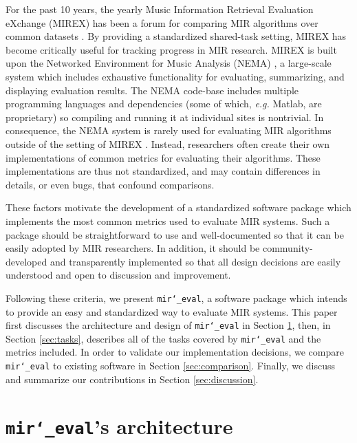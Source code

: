 \documentclass{article}
\def\eg{\emph{e.g.}}
\def\mireval{\texttt{mir\char`_eval}}
\begin{document}
For the past 10 years, the yearly Music Information Retrieval Evaluation eXchange (MIREX) has been a forum for comparing MIR algorithms over common datasets \cite{downie2008music}.
By providing a standardized shared-task setting, MIREX has become critically useful for tracking progress in MIR research.
MIREX is built upon the Networked Environment for Music Analysis (NEMA) \cite{west2010networked}, a large-scale system which includes exhaustive functionality for evaluating, summarizing, and displaying evaluation results.
The NEMA code-base includes multiple programming languages and dependencies (some of which, \eg{} Matlab, are proprietary) so compiling and running it at individual sites is nontrivial. 
%
In consequence, the NEMA system is rarely used for evaluating MIR algorithms outside of the setting of MIREX \cite{downie2008music}.
Instead, researchers often create their own implementations of common metrics for evaluating their algorithms.
These implementations are thus not standardized, and may contain differences in details, or even bugs, that confound comparisons.

These factors motivate the development of a standardized software package which implements the most common metrics used to evaluate MIR systems.
Such a package should be straightforward to use and well-documented so that it can be easily adopted by MIR researchers.
In addition, it should be community-developed and transparently implemented so that all design decisions are easily understood and open to discussion and improvement.

Following these criteria, we present \mireval{}, a software package which intends to provide an easy and standardized way to evaluate MIR systems.
This paper first discusses the architecture and design of \mireval{} in Section \ref{sec:architecture}, then, in Section \ref{sec:tasks}, describes all of the tasks covered by \mireval{} and the metrics included.
In order to validate our implementation decisions, we compare \mireval{} to existing software in Section \ref{sec:comparison}.
Finally, we discuss and summarize our contributions in Section \ref{sec:discussion}.

\section{\mireval{}'s architecture}
\label{sec:architecture}
\end{document}
